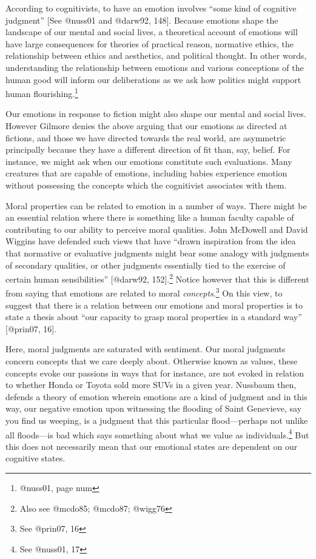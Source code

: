 \documentclass[
  letterpaper,
  DIV=11,
  numbers=noendperiod]{scrartcl}
\theoremstyle{remark}
\begin{document}
According to cognitivists, to have an emotion involves ``some kind of
cognitive judgment'' {[}See @nuss01 and @darw92, 148{]}. Because
emotions shape the landscape of our mental and social lives, a
theoretical account of emotions will have large consequences for
theories of practical reason, normative ethics, the relationship between
ethics and aesthetics, and political thought. In other words,
understanding the relationship between emotions and various conceptions
of the human good will inform our deliberations as we ask how politics
might support human flourishing.\footnote{@nuss01, page num}

Our emotions in response to fiction might also shape our mental and
social lives. However Gilmore denies the above arguing that our emotions
as directed at fictions, and those we have directed towards the real
world, are asymmetric principally because they have a different
direction of fit than, say, belief. For instance, we might ask when our
emotions constitute such evaluations. Many creatures that are capable of
emotions, including babies experience emotion without possessing the
concepts which the cognitivist associates with them.

Moral properties can be related to emotion in a number of ways. There
might be an essential relation where there is something like a human
faculty capable of contributing to our ability to perceive moral
qualities. John McDowell and David Wiggins have defended such views that
have ``drawn inspiration from the idea that normative or evaluative
judgments might bear some analogy with judgments of secondary qualities,
or other judgments essentially tied to the exercise of certain human
sensibilities'' {[}@darw92, 152{]}.\footnote{Also see @mcdo85; @mcdo87;
  @wigg76} Notice however that this is different from saying that
emotions are related to moral \emph{concepts}.\footnote{See @prin07, 16}
On this view, to suggest that there is a relation between our emotions
and moral properties is to state a thesis about ``our capacity to grasp
moral properties in a standard way'' {[}@prin07, 16{]}.

Here, moral judgments are saturated with sentiment. Our moral judgments
concern concepts that we care deeply about. Otherwise known as values,
these concepts evoke our passions in ways that for instance, are not
evoked in relation to whether Honda or Toyota sold more SUVs in a given
year. Nussbaum then, defends a theory of emotion wherein emotions are a
kind of judgment and in this way, our negative emotion upon witnessing
the flooding of Saint Genevieve, say you find us weeping, is a judgment
that this particular flood---perhaps not unlike all floods---is bad
which says something about what we value as individuals.\footnote{See
  @nuss01, 17} But this does not necessarily mean that our emotional
states are dependent on our cognitive states.
\end{document}
